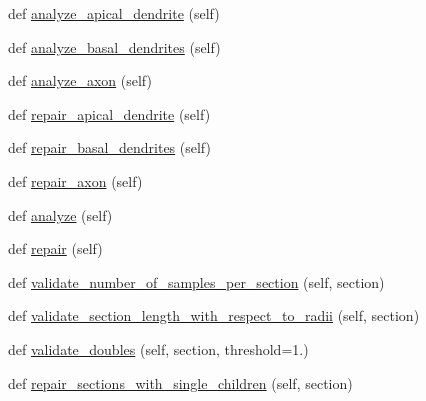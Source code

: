 \begin{DoxyCompactItemize}
\item 
def \hyperlink{classmeshy_1_1neuromorphovis_1_1morphologies_1_1morphology__analyzer_1_1MorphologyAnalyzer_a1c5f92100e72bd5701bcf3d1a682bf5e}{analyze\+\_\+apical\+\_\+dendrite} (self)
\item 
def \hyperlink{classmeshy_1_1neuromorphovis_1_1morphologies_1_1morphology__analyzer_1_1MorphologyAnalyzer_ac570e553ed95e8421a72fe4e70cdd729}{analyze\+\_\+basal\+\_\+dendrites} (self)
\item 
def \hyperlink{classmeshy_1_1neuromorphovis_1_1morphologies_1_1morphology__analyzer_1_1MorphologyAnalyzer_aac2270270612d2e6a10f06732bd6da74}{analyze\+\_\+axon} (self)
\item 
def \hyperlink{classmeshy_1_1neuromorphovis_1_1morphologies_1_1morphology__analyzer_1_1MorphologyAnalyzer_a6b589925886c38cd9a1bbb7b3ca45e62}{repair\+\_\+apical\+\_\+dendrite} (self)
\item 
def \hyperlink{classmeshy_1_1neuromorphovis_1_1morphologies_1_1morphology__analyzer_1_1MorphologyAnalyzer_a07b439763b44300f07e987149cc4189b}{repair\+\_\+basal\+\_\+dendrites} (self)
\item 
def \hyperlink{classmeshy_1_1neuromorphovis_1_1morphologies_1_1morphology__analyzer_1_1MorphologyAnalyzer_a5d75ad78055e33511f6763cfadf119ae}{repair\+\_\+axon} (self)
\item 
def \hyperlink{classmeshy_1_1neuromorphovis_1_1morphologies_1_1morphology__analyzer_1_1MorphologyAnalyzer_a746560c45a4671df79cd7e4f7db355f4}{analyze} (self)
\item 
def \hyperlink{classmeshy_1_1neuromorphovis_1_1morphologies_1_1morphology__analyzer_1_1MorphologyAnalyzer_a383515886441682db145aff08d4471c8}{repair} (self)
\item 
def \hyperlink{classmeshy_1_1neuromorphovis_1_1morphologies_1_1morphology__analyzer_1_1MorphologyAnalyzer_a7eb23f5fbe88b7ca7923154d71cb53ab}{validate\+\_\+number\+\_\+of\+\_\+samples\+\_\+per\+\_\+section} (self, section)
\item 
def \hyperlink{classmeshy_1_1neuromorphovis_1_1morphologies_1_1morphology__analyzer_1_1MorphologyAnalyzer_afc888232e6d306a807feeff70d402e8f}{validate\+\_\+section\+\_\+length\+\_\+with\+\_\+respect\+\_\+to\+\_\+radii} (self, section)
\item 
def \hyperlink{classmeshy_1_1neuromorphovis_1_1morphologies_1_1morphology__analyzer_1_1MorphologyAnalyzer_a99a95aec1438b48251f4ba37d83c1839}{validate\+\_\+doubles} (self, section, threshold=1.)
\item 
def \hyperlink{classmeshy_1_1neuromorphovis_1_1morphologies_1_1morphology__analyzer_1_1MorphologyAnalyzer_a24407e250d04c8f94ad5aa2bfca96631}{repair\+\_\+sections\+\_\+with\+\_\+single\+\_\+children} (self, section)

\end{DoxyCompactItemize}
